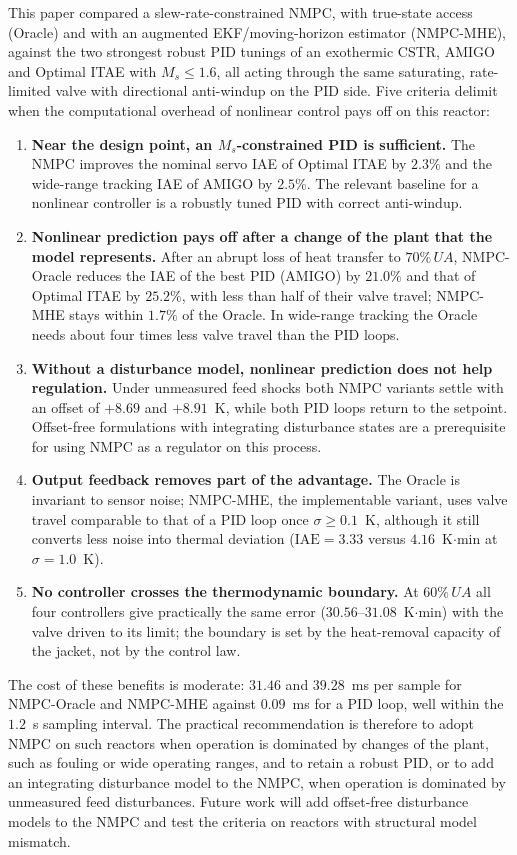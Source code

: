 
This paper compared a slew-rate-constrained NMPC, with true-state access (Oracle) and with an augmented EKF/moving-horizon estimator (NMPC-MHE), against the two strongest robust PID tunings of an exothermic CSTR, AMIGO and Optimal ITAE with $M_s \le 1.6$, all acting through the same saturating, rate-limited valve with directional anti-windup on the PID side. Five criteria delimit when the computational overhead of nonlinear control pays off on this reactor:
\begin{enumerate}
    \item \textbf{Near the design point, an $M_s$-constrained PID is sufficient.} The NMPC improves the nominal servo IAE of Optimal ITAE by $2.3\%$ and the wide-range tracking IAE of AMIGO by $2.5\%$. The relevant baseline for a nonlinear controller is a robustly tuned PID with correct anti-windup.
    \item \textbf{Nonlinear prediction pays off after a change of the plant that the model represents.} After an abrupt loss of heat transfer to $70\%\,UA$, NMPC-Oracle reduces the IAE of the best PID (AMIGO) by $21.0\%$ and that of Optimal ITAE by $25.2\%$, with less than half of their valve travel; NMPC-MHE stays within $1.7\%$ of the Oracle. In wide-range tracking the Oracle needs about four times less valve travel than the PID loops.
    \item \textbf{Without a disturbance model, nonlinear prediction does not help regulation.} Under unmeasured feed shocks both NMPC variants settle with an offset of $+8.69$ and $+8.91$~K, while both PID loops return to the setpoint. Offset-free formulations with integrating disturbance states are a prerequisite for using NMPC as a regulator on this process.
    \item \textbf{Output feedback removes part of the advantage.} The Oracle is invariant to sensor noise; NMPC-MHE, the implementable variant, uses valve travel comparable to that of a PID loop once $\sigma \ge 0.1$~K, although it still converts less noise into thermal deviation ($\mathrm{IAE} = 3.33$ versus $4.16$~K$\cdot$min at $\sigma = 1.0$~K).
    \item \textbf{No controller crosses the thermodynamic boundary.} At $60\%\,UA$ all four controllers give practically the same error ($30.56$--$31.08$~K$\cdot$min) with the valve driven to its limit; the boundary is set by the heat-removal capacity of the jacket, not by the control law.
\end{enumerate}
The cost of these benefits is moderate: $31.46$ and $39.28$~ms per sample for NMPC-Oracle and NMPC-MHE against $0.09$~ms for a PID loop, well within the $1.2$~s sampling interval. The practical recommendation is therefore to adopt NMPC on such reactors when operation is dominated by changes of the plant, such as fouling or wide operating ranges, and to retain a robust PID, or to add an integrating disturbance model to the NMPC, when operation is dominated by unmeasured feed disturbances. Future work will add offset-free disturbance models to the NMPC and test the criteria on reactors with structural model mismatch.
